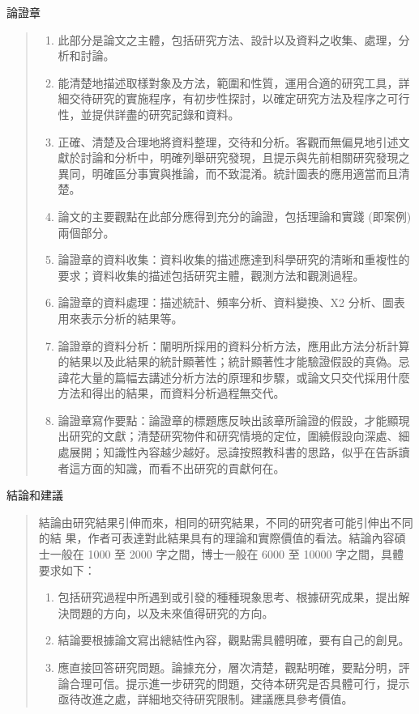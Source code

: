 \documentclass[
    writingLanguage=chinese, %
    addPageTitle=on,  %
    addDeclaration=on, %
    addMUSTlog=off, %
    addFigTOC=on, %
    addTabTOC=on, %
    refIndent=off, %
    printMod=off, %
]{.def/must}
\begin{document}
\noindent\faHandORight 論證章
\begin{quote}
\begin{enumerate}
    \item 此部分是論文之主體，包括研究方法、設計以及資料之收集、處理，分析和討論。
    \item  能清楚地描述取樣對象及方法，範圍和性質，運用合適的研究工具，詳細交待研究的實施程序，有初步性探討，以確定研究方法及程序之可行性，並提供詳盡的研究記錄和資料。
    \item  正確、清楚及合理地將資料整理，交待和分析。客觀而無偏見地引述文獻於討論和分析中，明確列舉研究發現，且提示與先前相關研究發現之異同，明確區分事實與推論，而不致混淆。統計圖表的應用適當而且清楚。
    \item 論文的主要觀點在此部分應得到充分的論證，包括理論和實踐 (即案例)兩個部分。
    \item 論證章的資料收集：資料收集的描述應達到科學研究的清晰和重複性的要求；資料收集的描述包括研究主體，觀測方法和觀測過程。
    \item 論證章的資料處理：描述統計、頻率分析、資料變換、X2 分析、圖表用來表示分析的結果等。
    \item 論證章的資料分析：闡明所採用的資料分析方法，應用此方法分析計算的結果以及此結果的統計顯著性；統計顯著性才能驗證假設的真偽。忌諱花大量的篇幅去講述分析方法的原理和步驟，或論文只交代採用什麼方法和得出的結果，而資料分析過程無交代。
  \item 論證章寫作要點：論證章的標題應反映出該章所論證的假設，才能顯現出研究的文獻；清楚研究物件和研究情境的定位，圍繞假設向深處、細處展開；知識性內容越少越好。忌諱按照教科書的思路，似乎在告訴讀者這方面的知識，而看不出研究的貢獻何在。
\end{enumerate}

\end{quote}

\noindent\faHandORight 結論和建議
\begin{quote}
結論由研究結果引伸而來，相同的研究結果，不同的研究者可能引伸出不同的結
果，作者可表達對此結果具有的理論和實際價值的看法。結論內容碩士一般在
1000 至 2000 字之間，博士一般在 6000 至 10000 字之間，具體要求如下：

\begin{enumerate}
    \item 包括研究過程中所遇到或引發的種種現象思考、根據研究成果，提出解決問題的方向，以及未來值得研究的方向。
    \item 結論要根據論文寫出總結性內容，觀點需具體明確，要有自己的創見。
    \item 應直接回答研究問題。論據充分，層次清楚，觀點明確，要點分明，評論合理可信。提示進一步研究的問題，交待本研究是否具體可行，提示亟待改進之處，詳細地交待研究限制。建議應具參考價值。
\end{enumerate}
\end{quote}
\end{document}
